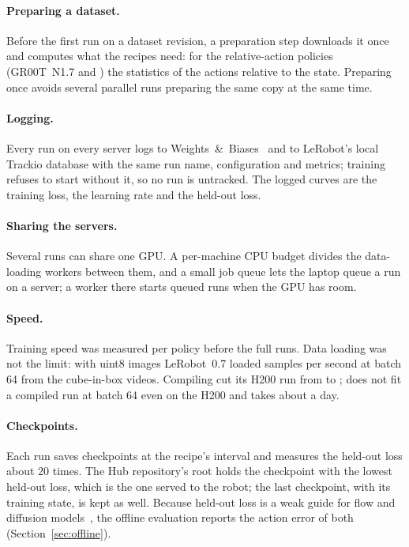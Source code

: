 \paragraph{Preparing a dataset.} Before the first run on a dataset revision, a preparation step downloads it once and
computes what the recipes need: for the relative-action policies (GR00T~N1.7 and \pizerofive) the statistics of the
actions relative to the state. Preparing once avoids several parallel runs preparing the same copy at the same time.

\paragraph{Logging.} Every run on every server logs to Weights~\&~Biases~\cite{wandb} and to LeRobot's local Trackio
database with the same run name, configuration and metrics; training refuses to start without it, so no run is
untracked. The logged curves are the training loss, the learning rate and the held-out loss.

\paragraph{Sharing the servers.} Several runs can share one GPU. A per-machine CPU budget divides the data-loading
workers between them, and a small job queue lets the laptop queue a run on a server; a worker there starts queued
runs when the GPU has room.

\paragraph{Speed.} Training speed was measured per policy before the full runs. Data loading was not the limit: with
uint8 images LeRobot~0.7 loaded  samples per second at batch 64 from the cube-in-box videos.
Compiling \smolvla{} cut its H200 run from  to ; \pizerofive{}
does not fit a compiled run at batch 64 even on the H200 and takes about a day.

\paragraph{Checkpoints.} Each run saves checkpoints at the recipe's interval and measures the held-out loss about 20
times. The Hub repository's root holds the checkpoint with the lowest held-out loss, which is the one served to the
robot; the last checkpoint, with its training state, is kept as well. Because held-out loss is a weak guide for flow
and diffusion models~\cite{valloss2026}, the offline evaluation reports the action error of both
(Section~\ref{sec:offline}).

